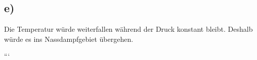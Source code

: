 

\subsection*{e)}

Die Temperatur würde weiterfallen während der Druck konstant bleibt. Deshalb würde es ins Nassdampfgebiet übergehen.

```